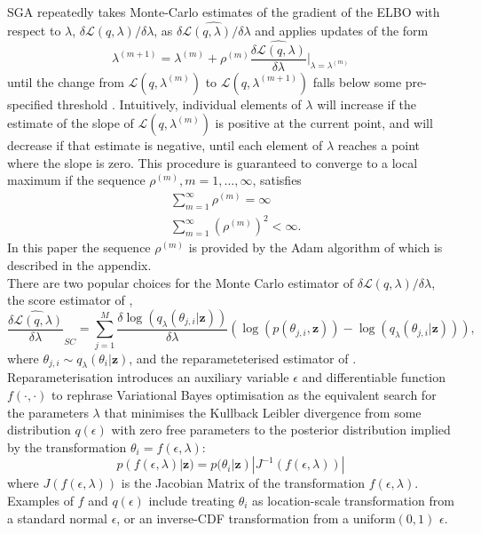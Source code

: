 \documentclass[12pt,a4paper]{article}\usepackage[]{graphicx}\usepackage[]{color}
\begin{document}
SGA repeatedly takes Monte-Carlo estimates of the gradient of the ELBO with respect to $\lambda$, $\delta\mathcal{L}(q, \lambda) / \delta \lambda$, as $\widehat{\delta\mathcal{L}(q, \lambda) / \delta \lambda}$ and applies updates of the form
\begin{equation}
\label{gradientAscent}
\lambda^{(m+1)} = \lambda^{(m)} + \rho^{(m)} \widehat{\frac{\delta\mathcal{L}(q, \lambda)}{\delta \lambda}} \bigg\rvert_{\lambda = \lambda^{(m)}}
\end{equation}
until the change from $\mathcal{L}(q, \lambda^{(m)})$ to $\mathcal{L}(q, \lambda^{(m+1)})$ falls below some pre-specified threshold \citep{Hoffman2013}. Intuitively, individual elements of $\lambda$ will increase if the estimate of the slope of $\mathcal{L}(q, \lambda^{(m)})$ is positive at the current point, and will decrease if that estimate is negative, until each element of $\lambda$ reaches a point where the slope is zero. This procedure is guaranteed to converge to a local maximum \citep{Robbins1951} if the sequence $\rho^{(m)}, m = 1, \dots, \infty$, satisfies
\begin{align}
&\sum_{m=1}^{\infty} \rho^{(m)} =  \infty \\
&\sum_{m=1}^{\infty} (\rho^{(m)})^2 <  \infty.
\end{align}
In this paper the sequence $\rho^{(m)}$ is provided by the Adam algorithm of \citet{Kingma2015b} which is described in the appendix.
\\

There are two popular choices for the Monte Carlo estimator of $\delta\mathcal{L}(q, \lambda) / \delta \lambda$, the score estimator of \citet{Ranganath2014}, 
\begin{equation}
\label{scoreDeriv}
\widehat{\frac{\delta\mathcal{L}(q, \lambda)}{\delta \lambda}}_{SC} = \sum_{j = 1}^M \frac{\delta \log(q_{\lambda}(\theta_{j, i} | \textbf{z}))}{\delta \lambda} \left(\log(p(\theta_{j, i}, \textbf{z})) - \log(q_{\lambda}(\theta_{j, i} | \textbf{z})) \right),
\end{equation}
where $\theta_{j, i} \sim q_{\lambda}(\theta_i | \textbf{z})$, and the reparameteterised estimator of \citet{Kingma2014}. Reparameterisation introduces an auxiliary variable $\epsilon$ and differentiable function $f(\cdot, \cdot)$ to rephrase Variational Bayes optimisation as the equivalent search for the parameters $\lambda$ that minimises the Kullback Leibler divergence from some distribution $q(\epsilon)$ with zero free parameters to the posterior distribution implied by the transformation $\theta_i = f(\epsilon, \lambda)$:
\begin{equation}
\label{rpDist}
p(f(\epsilon, \lambda) | \textbf{z}) = p(\theta_i | \textbf{z}) |J^{-1}(f(\epsilon, \lambda))|
\end{equation}
where $J(f(\epsilon, \lambda))$ is the Jacobian Matrix of the transformation $f(\epsilon, \lambda)$. Examples of $f$ and $q(\epsilon)$ include treating $\theta_i$ as location-scale transformation from a standard normal $\epsilon$, or an inverse-CDF transformation from a uniform$(0, 1)$ $\epsilon$. 
\\
\end{document}
